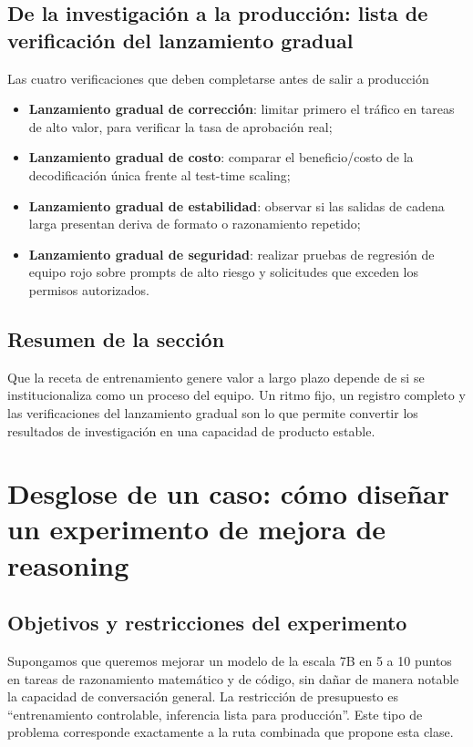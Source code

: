 \documentclass[a4paper]{article}
\begin{document}
\subsection{De la investigación a la producción: lista de verificación del lanzamiento gradual}
\begin{warningbox}{Las cuatro verificaciones que deben completarse antes de salir a producción}
\begin{itemize}
    \item \textbf{Lanzamiento gradual de corrección}: limitar primero el tráfico en tareas de alto valor, para verificar la tasa de aprobación real;
    \item \textbf{Lanzamiento gradual de costo}: comparar el beneficio/costo de la decodificación única frente al test-time scaling;
    \item \textbf{Lanzamiento gradual de estabilidad}: observar si las salidas de cadena larga presentan deriva de formato o razonamiento repetido;
    \item \textbf{Lanzamiento gradual de seguridad}: realizar pruebas de regresión de equipo rojo sobre prompts de alto riesgo y solicitudes que exceden los permisos autorizados.
\end{itemize}
\end{warningbox}

\subsection{Resumen de la sección}
Que la receta de entrenamiento genere valor a largo plazo depende de si se institucionaliza como un proceso del equipo. Un ritmo fijo, un registro completo y las verificaciones del lanzamiento gradual son lo que permite convertir los resultados de investigación en una capacidad de producto estable.

\section{Desglose de un caso: cómo diseñar un experimento de mejora de reasoning}

\subsection{Objetivos y restricciones del experimento}
Supongamos que queremos mejorar un modelo de la escala 7B en 5 a 10 puntos en tareas de razonamiento matemático y de código, sin dañar de manera notable la capacidad de conversación general. La restricción de presupuesto es ``entrenamiento controlable, inferencia lista para producción''. Este tipo de problema corresponde exactamente a la ruta combinada que propone esta clase.
\end{document}
